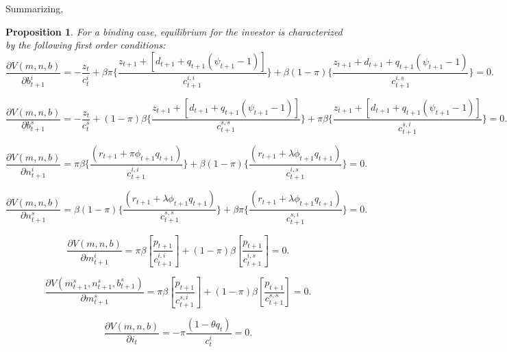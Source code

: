 \documentclass[12pt]{article}%
\newtheorem{proposition}{Proposition}
\begin{document}
Summarizing,
\begin{proposition}
For a binding case, equilibrium for the investor is characterized
by the following first order conditions:
\begin{equation}
\frac{\partial V(m,n,b)}{\partial b^i_{t+1}} = -\frac{z_{t}}{c^i_t}+\beta \pi \Big\{\frac{z_{t+1}+[d_{t+1}+q_{t+1}
(\psi_{t+1}-1)]}{c^{i,i}_{t+1}}\Big\}+\beta (1-\pi)
\Big\{\frac{z_{t+1}+d_{t+1}+q_{t+1}(\psi_{t+1}-1)}{c^{i,s}_{t+1}}
\Big\}=0.
\end{equation}

\begin{equation}
\frac{\partial V(m,n,b)}{\partial b^s_{t+1}}=-\frac{z_t}{c^s_t}
+(1-\pi)\beta \Big\{ \frac{z_{t+1}+[d_{t+1}+q_{t+1}(\psi_{t+1}-1)]}{c^{s,s}_{t+1}}
\Big\} +\pi \beta \Big\{ \frac{z_{t+1}+[d_{t+1}+q_{t+1}(\psi_{t+1}-1)]}{c^{s,i}_{t+1}}\Big\}
= 0.
\end{equation}

\begin{equation}
\frac{\partial V(m,n,b)}{\partial n^i_{t+1}}=
\pi \beta \Big\{ \frac{(r_{t+1}+\pi \phi_{t+1} q_{t+1})}{c^{i,i}_{t+1}}\Big\}
+ \beta (1-\pi) \Big\{ \frac{(r_{t+1}+\lambda \phi_{t+1}q_{t+1})}{c^{i,s}_{t+1}}\Big\}=0.
\end{equation}

\begin{equation}
\frac{\partial V(m,n,b)}{\partial n^s_{t+1}}
= \beta (1-\pi) \Big\{ \frac{(r_{t+1}+\lambda
\phi_{t+1}q_{t+1})}{c^{s,s}_{t+1}}\Big\}
+\beta \pi \Big\{ \frac{(r_{t+1}+\lambda \phi_{t+1}q_{t+1})}{c^{s,i}_{t+1}}
\Big\} = 0.
\end{equation}

\begin{equation}
\frac{\partial V(m,n,b)}{\partial m^i_{t+1}}=
\pi \beta [\frac{p_{t+1}}{c^{i,i}_{t+1}}]+(1-\pi)\beta
[\frac{p_{t+1}}{c^{i,s}_{t+1}}]=0.
\end{equation}

\begin{equation}
\frac{\partial V(m^s_{t+1},n^s_{t+1},b^s_{t+1})}{\partial m^s_{t+1}}=
\pi \beta [\frac{p_{t+1}}{c^{s,i}_{t+1}}]+(1-\pi)
 \beta [\frac{p_{t+1}}{c^{s,s}_{t+1}}] = 0.
\end{equation}

\begin{equation}
\frac{\partial V(m,n,b)}{\partial i_t}=
-\pi \frac{(1-\theta q_t)}{c^i_t} = 0.
\end{equation}
\end{proposition}
\end{document}
